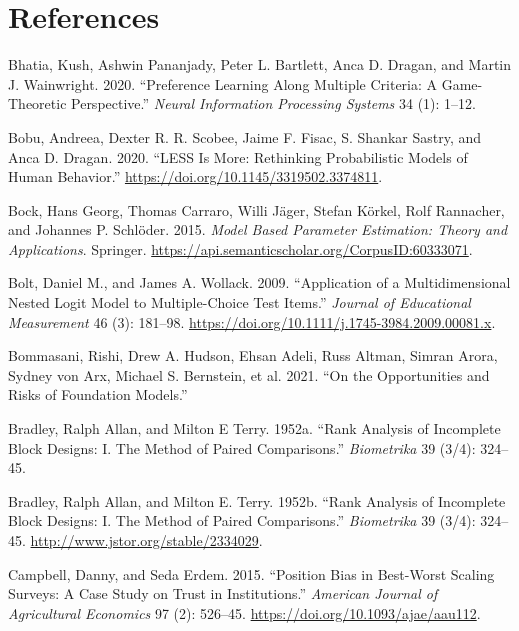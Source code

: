 \documentclass[
  letterpaper,
  numbers=noenddot,
  DIV=11,
  oneside]{scrreprt}
\newlength{\cslhangindent}
\newenvironment{CSLReferences}[2] %
 {\begin{list}{}{%
  \setlength{\itemindent}{0pt}
  \setlength{\leftmargin}{0pt}
  \setlength{\parsep}{0pt}
  \ifodd #1
   \setlength{\leftmargin}{\cslhangindent}
   \setlength{\itemindent}{-1\cslhangindent}
  \fi
  \setlength{\itemsep}{#2\baselineskip}}}
 {\end{list}}
\theoremstyle{remark}
\begin{document}
\section*{References}\label{bibliography-2}


\label{refs-2}
\begin{CSLReferences}{1}{0}
Bhatia, Kush, Ashwin Pananjady, Peter L. Bartlett, Anca D. Dragan, and
Martin J. Wainwright. 2020. {``Preference Learning Along Multiple
Criteria: A Game-Theoretic Perspective.''} \emph{Neural Information
Processing Systems} 34 (1): 1--12.

Bobu, Andreea, Dexter R. R. Scobee, Jaime F. Fisac, S. Shankar Sastry,
and Anca D. Dragan. 2020. {``LESS Is More: Rethinking Probabilistic
Models of Human Behavior.''}
\url{https://doi.org/10.1145/3319502.3374811}.

Bock, Hans Georg, Thomas Carraro, Willi Jäger, Stefan Körkel, Rolf
Rannacher, and Johannes P. Schlöder. 2015. \emph{Model Based Parameter
Estimation: Theory and Applications}. Springer.
\url{https://api.semanticscholar.org/CorpusID:60333071}.

Bolt, Daniel M., and James A. Wollack. 2009. {``Application of a
Multidimensional Nested Logit Model to Multiple-Choice Test Items.''}
\emph{Journal of Educational Measurement} 46 (3): 181--98.
\url{https://doi.org/10.1111/j.1745-3984.2009.00081.x}.

Bommasani, Rishi, Drew A. Hudson, Ehsan Adeli, Russ Altman, Simran
Arora, Sydney von Arx, Michael S. Bernstein, et al. 2021. {``On the
Opportunities and Risks of Foundation Models.''}

Bradley, Ralph Allan, and Milton E Terry. 1952a. {``Rank Analysis of
Incomplete Block Designs: I. The Method of Paired Comparisons.''}
\emph{Biometrika} 39 (3/4): 324--45.

Bradley, Ralph Allan, and Milton E. Terry. 1952b. {``Rank Analysis of
Incomplete Block Designs: I. The Method of Paired Comparisons.''}
\emph{Biometrika} 39 (3/4): 324--45.
\url{http://www.jstor.org/stable/2334029}.

Campbell, Danny, and Seda Erdem. 2015. {``Position Bias in Best-Worst
Scaling Surveys: A Case Study on Trust in Institutions.''}
\emph{American Journal of Agricultural Economics} 97 (2): 526--45.
\url{https://doi.org/10.1093/ajae/aau112}.


\end{CSLReferences}
\end{document}
